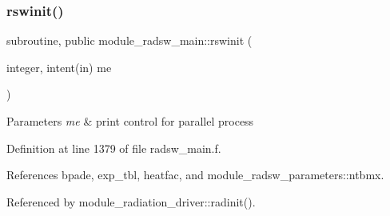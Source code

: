 \subsubsection{\texorpdfstring{rswinit()}{rswinit()}}
{\footnotesize\ttfamily subroutine, public module\+\_\+radsw\+\_\+main\+::rswinit (\begin{DoxyParamCaption}\item[{integer, intent(in)}]{me }\end{DoxyParamCaption})}


\begin{DoxyParams}{Parameters}
{\em me} & print control for parallel process \\
\hline
\end{DoxyParams}


Definition at line 1379 of file radsw\+\_\+main.\+f.



References bpade, exp\+\_\+tbl, heatfac, and module\+\_\+radsw\+\_\+parameters\+::ntbmx.



Referenced by module\+\_\+radiation\+\_\+driver\+::radinit().

\mbox{\label{group__module__radsw__main_ga5eb9918ebc222138a9dad016440e1a74}} 

